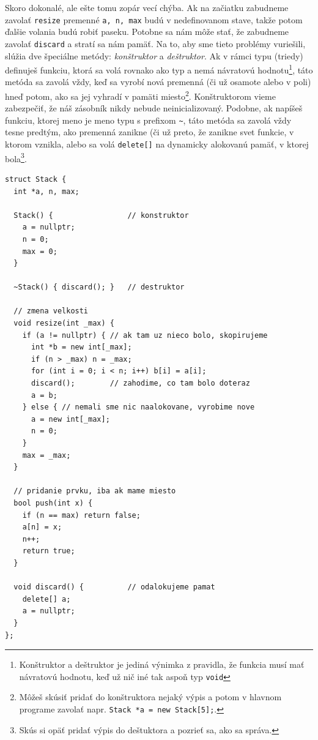 \documentclass[10pt]{article}
\def\prg{\lstinline}
\def\ods{\vspace*{10pt}}
\begin{document}
\ods
Skoro dokonalé, ale ešte tomu zopár vecí chýba. Ak na začiatku zabudneme zavolať {\tt resize}
premenné {\tt a, n, max} budú v nedefinovanom stave, takže potom ďalšie volania budú
robiť paseku. Potobne sa nám môže stať, že zabudneme zavolať {\tt discard} a stratí sa nám
pamäť. Na to, aby sme tieto problémy vuriešili, slúžia dve špeciálne metódy: {\em konštruktor}
a {\em deštruktor}. Ak v rámci typu (triedy) definuješ funkciu, ktorá sa volá rovnako ako
typ a nemá návratovú hodnotu\footnote{Konštruktor a deštruktor je jediná výnimka z pravidla,
že funkcia musí mať návratovú hodnotu, keď už nič iné tak aspoň typ {\tt void}}, táto metóda
sa zavolá vždy, keď sa vyrobí nová premenná (či už osamote alebo v poli) hneď potom, ako
sa jej vyhradí v pamäti miesto\footnote{Môžeš skúsiť pridať do konštruktora nejaký výpis
a potom v hlavnom programe zavolať napr. \prg!Stack *a = new Stack[5];!.}. Konštruktorom
vieme zabezpečiť, že náš zásobník nikdy nebude neinicializovaný. Podobne, ak napíšeš
funkciu, ktorej meno je meno typu s prefixom {\tt\textasciitilde}, táto metóda
sa zavolá vždy tesne predtým, ako premenná zanikne (či už preto, že zanikne svet funkcie,
v ktorom vznikla, alebo sa volá \prg!delete[]! na dynamicky alokovanú pamäť, v ktorej 
bola\footnote{%
  Skús si opäť pridať výpis do deštuktora a pozrieť sa, ako sa správa.}.


\begin{lstlisting}[] 
struct Stack {
  int *a, n, max;
  
  Stack() {                 // konstruktor
    a = nullptr;
    n = 0;
    max = 0;
  }

  ~Stack() { discard(); }   // destruktor
  
  // zmena velkosti
  void resize(int _max) {  
    if (a != nullptr) { // ak tam uz nieco bolo, skopirujeme
      int *b = new int[_max];
      if (n > _max) n = _max;
      for (int i = 0; i < n; i++) b[i] = a[i];
      discard();        // zahodime, co tam bolo doteraz
      a = b; 
    } else { // nemali sme nic naalokovane, vyrobime nove
      a = new int[_max];
      n = 0;
    }
    max = _max;
  } 
  
  // pridanie prvku, iba ak mame miesto
  bool push(int x) {
    if (n == max) return false;
    a[n] = x;
    n++;
    return true;
  } 
  
  void discard() {          // odalokujeme pamat
    delete[] a;
    a = nullptr;
  } 
};
\end{lstlisting}
\end{document}
